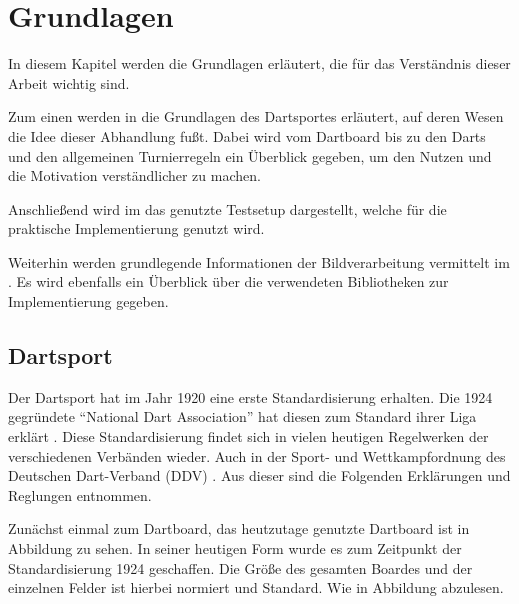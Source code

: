 
\chapter{Grundlagen}
\label{chap:fundamentals}
In diesem Kapitel werden die Grundlagen erläutert, die für das Verständnis dieser Arbeit wichtig sind. 

Zum einen werden in  die Grundlagen des Dartsportes erläutert, auf deren Wesen die Idee dieser Abhandlung fußt. Dabei wird vom Dartboard bis zu den Darts und den allgemeinen Turnierregeln ein Überblick gegeben, um den Nutzen und die Motivation verständlicher zu machen.

Anschließend wird im  das genutzte Testsetup dargestellt, welche für die praktische Implementierung genutzt wird.

Weiterhin werden grundlegende Informationen der Bildverarbeitung vermittelt im . Es wird ebenfalls ein Überblick über die verwendeten Bibliotheken zur Implementierung gegeben.
\section{Dartsport}
\label{sec:darts}
Der Dartsport hat im Jahr 1920 eine erste Standardisierung erhalten. Die 1924 gegründete "`National Dart Association"' hat diesen zum Standard ihrer Liga erklärt \autocite[5]{guide2013}. Diese Standardisierung findet sich in vielen heutigen Regelwerken der verschiedenen Verbänden wieder. Auch in der Sport- und Wettkampfordnung des Deutschen
Dart-Verband (DDV) \autocite{DartsRegel2016}. Aus dieser sind die Folgenden Erklärungen und Reglungen entnommen. 

Zunächst einmal zum Dartboard, das heutzutage genutzte Dartboard ist in Abbildung zu sehen. In seiner heutigen Form wurde es zum Zeitpunkt der Standardisierung 1924 geschaffen. Die Größe des gesamten Boardes und der einzelnen Felder ist hierbei normiert und Standard. Wie in Abbildung  abzulesen. 

